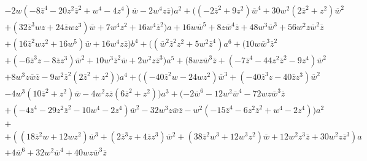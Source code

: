 \documentclass[12pt]{amsart}
\begin{document}
\begin{footnotesize}
\begin{multline*}
 -2
w ( -8{{ \overline{z}}}^{4}-20{z}^{2}{{ \overline{z}}}^{2}+{w}^{4}-4{z}^{
4} ) { \overline{w}}-2{w}^{4}z{ \overline{z}} ) {a}^{2}+ ( 
 ( -2{{ \overline{z}}}^{2}+9{z}^{2} ) {{ \overline{w}}}^{4}+30{w}^{
2} ( 2{{ \overline{z}}}^{2}+{z}^{2} ) {{ \overline{w}}}^{2}\\
+ ( 32
{{ \overline{z}}}^{3}wz+24{ \overline{z}}w{z}^{3} ) { \overline{w}}+7{w}^{4}{
z}^{2}+16{w}^{4}{{ \overline{z}}}^{2} ) a+16w{{ \overline{w}}}^{5}+8z{{
 \overline{w}}}^{4}{ \overline{z}}+48{w}^{3}{{ \overline{w}}}^{3}+56{w}^{2}z{{ \overline{w}}}^
{2}{ \overline{z}}\\
+ ( 16{{ \overline{z}}}^{2}w{z}^{2}+16{w}^{5} ) {
 \overline{w}}+16{w}^{4}z{ \overline{z}} ) {b}^{4}+ (  ( {{ \overline{w}}
}^{2}{{ \overline{z}}}^{2}{z}^{2}+5{w}^{2}{{ \overline{z}}}^{4} ) {a}^{6}+
 ( 10w{{ \overline{w}}}^{3}{{ \overline{z}}}^{2}\\
 + ( -6{{ \overline{z}}}^{3}z-
8{ \overline{z}}{z}^{3} ) {{ \overline{w}}}^{2}+10{w}^{3}{{ \overline{z}}}^{2}{
 \overline{w}}+2{w}^{2}z{{ \overline{z}}}^{3} ) {a}^{5}+ ( 8wz{{ 
\overline{w}}}^{3}{ \overline{z}}+ ( -7{{ \overline{z}}}^{4}-44{z}^{2}{{ \overline{z}}}^{2}-
9{z}^{4} ) {{ \overline{w}}}^{2}\\
+8{w}^{3}z{ \overline{w}}{ \overline{z}}-9{w}
^{2}{{ \overline{z}}}^{2} ( 2{{ \overline{z}}}^{2}+{z}^{2} )  ) {
a}^{4}+ (  ( -40{{ \overline{z}}}^{2}w-24w{z}^{2} ) {{
 \overline{w}}}^{3}+ ( -40{{ \overline{z}}}^{3}z-40{ \overline{z}}{z}^{3}
 ) {{ \overline{w}}}^{2}\\
 -4{w}^{3} ( 10{{ \overline{z}}}^{2}+{z}^{2}
 ) { \overline{w}}-4{w}^{2}z{ \overline{z}} ( 6{{ \overline{z}}}^{2}+{z}^{
2} )  ) {a}^{3}+ ( -2{{ \overline{w}}}^{6}-12{w}^{2}{{
 \overline{w}}}^{4}-72wz{{ \overline{w}}}^{3}{ \overline{z}}\\
 + ( -4{{ \overline{z}}}^{4}-
29{z}^{2}{{ \overline{z}}}^{2}-10{w}^{4}-2{z}^{4} ) {{ \overline{w}}}^{2
}-32{w}^{3}z{ \overline{w}}{ \overline{z}}-{w}^{2} ( -15{{ \overline{z}}}^{4}-6
{z}^{2}{{ \overline{z}}}^{2}+{w}^{4}-2{z}^{4} )  ) {a}^{2}\\
+
\end{multline*}
\begin{multline*}
+ (  ( 18{{ \overline{z}}}^{2}w+12w{z}^{2} ) {{ \overline{w}}}^{3
}+ ( 2{{ \overline{z}}}^{3}z+4{ \overline{z}}{z}^{3} ) {{ \overline{w}}}^{
2}+ ( 38{{ \overline{z}}}^{2}{w}^{3}+12{w}^{3}{z}^{2} ) { 
\overline{w}}+12{w}^{2}{z}^{3}{ \overline{z}}+30{w}^{2}z{{ \overline{z}}}^{3} ) a\\
+4
{{ \overline{w}}}^{6}+32{w}^{2}{{ \overline{w}}}^{4}+40wz{{ \overline{w}}}^{3}{ \overline{z}
}
\end{multline*}
\end{footnotesize}
\end{document}

